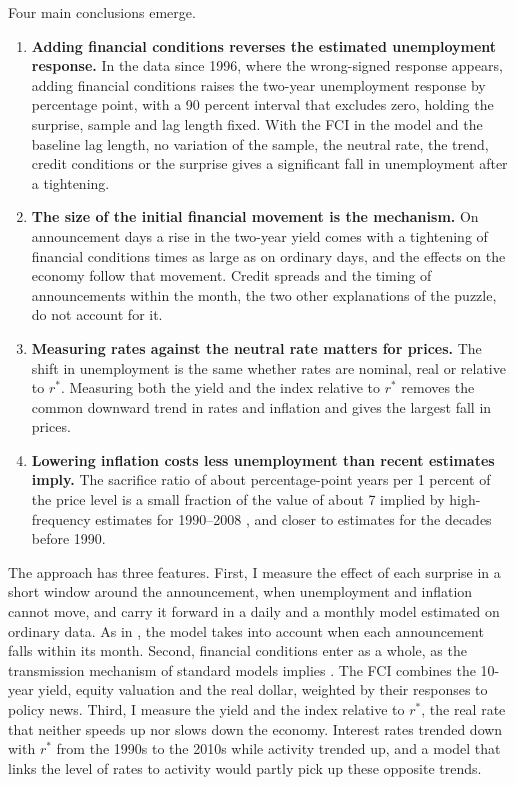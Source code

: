 \documentclass[11pt]{article}
\newcommand{\rs}{r^{*}}
\begin{document}
Four main conclusions emerge.
\begin{enumerate}\setlength\itemsep{0pt}
\item \textbf{Adding financial conditions reverses the estimated unemployment response.} In the data since 1996, where the wrong-signed response appears, adding financial conditions raises the two-year unemployment response by  percentage point, with a 90 percent interval that excludes zero, holding the surprise, sample and lag length fixed. With the FCI in the model and the baseline lag length, no variation of the sample, the neutral rate, the trend, credit conditions or the surprise gives a significant fall in unemployment after a tightening.
\item \textbf{The size of the initial financial movement is the mechanism.} On announcement days a rise in the two-year yield comes with a tightening of financial conditions  times as large as on ordinary days, and the effects on the economy follow that movement. Credit spreads and the timing of announcements within the month, the two other explanations of the puzzle, do not account for it.
\item \textbf{Measuring rates against the neutral rate matters for prices.} The shift in unemployment is the same whether rates are nominal, real or relative to $\rs$. Measuring both the yield and the index relative to $\rs$ removes the common downward trend in rates and inflation and gives the largest fall in prices.
\item \textbf{Lowering inflation costs less unemployment than recent estimates imply.} The sacrifice ratio of about  percentage-point years per 1 percent of the price level is a small fraction of the value of about 7 implied by high-frequency estimates for 1990--2008 \citep{barnichon2021}, and closer to estimates for the decades before 1990.
\end{enumerate}


The approach has three features. First, I measure the effect of each surprise in a short window around the announcement, when unemployment and inflation cannot move, and carry it forward in a daily and a monthly model estimated on ordinary data. As in \citet{jacobson2026}, the model takes into account when each announcement falls within its month. Second, financial conditions enter as a whole, as the transmission mechanism of standard models implies \citep{boivin2010}. The FCI combines the 10-year yield, equity valuation and the real dollar, weighted by their responses to policy news. Third, I measure the yield and the index relative to $\rs$, the real rate that neither speeds up nor slows down the economy. Interest rates trended down with $\rs$ from the 1990s to the 2010s \citep{laubach2003,holston2017,holston2023,hamilton2016,bauer2020,kiley2020} while activity trended up, and a model that links the level of rates to activity would partly pick up these opposite trends.
\end{document}
